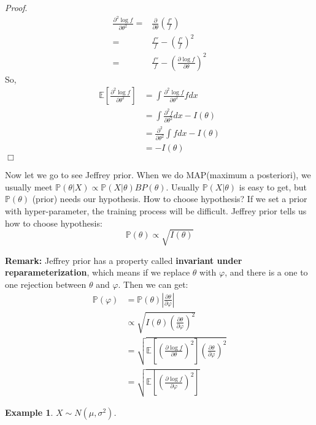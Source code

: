 \documentclass[11pt]{article}
\def\BP{{\bf P}}
\def\BP{{\mathbb P}}
\def\BE{{\mathbb E}}
\newtheorem{example}{Example}[section]
\begin{document}
\textit{Proof}.
  \begin{equation*}
    \begin{split}
      \frac{\partial^2 \log f}{\partial \theta^2} = & \frac{\partial}{\partial \theta} \left( \frac{f'}{f}\right) \\
       = & \frac{f''}{f} - \left(\frac{f'}{f}\right)^2 \\
       = & \frac{f''}{f} - \left(\frac{\partial \log f}{\partial \theta}\right)^2 
    \end{split}
  \end{equation*}
  So, \[\begin{split}
  \BE[\frac{\partial^2 \log f}{\partial \theta^2}] & = \int \frac{\partial^2 \log f}{\partial \theta^2} f dx \\
  & = \int \frac{\partial^2 f}{\partial \theta^2} dx - I(\theta) \\
  & = \frac{\partial^2}{\partial \theta^2} \int f dx - I(\theta)  \\
  & = - I(\theta)
  \end{split}\]
\hfill$\Box$
  
Now let we go to see Jeffrey prior. When we do MAP(maximum a posteriori), we usually meet $\BP(\theta | X) \propto \BP(X | \theta) BP(\theta)$. 
Usually $\BP(X | \theta)$ is easy to get, but $\BP(\theta)$ (prior) needs our hypothesis. How to choose hypothesis? If we set a prior with hyper-parameter, the training process will be difficult. Jeffrey prior tells us how to choose hypothesis:
\[ \BP(\theta) \propto \sqrt{I(\theta)}\]

\textbf{Remark:} Jeffrey prior has a property called \textbf{ invariant under reparameterization}, which means if we replace $\theta$ with $\varphi$, and there is a one to one rejection between $\theta$ and $\varphi$. Then we can get:
\[\begin{split} \BP(\varphi) & = \BP(\theta) \left| \frac{\partial \theta}{\partial \varphi} \right| \\
& \propto \sqrt{ I (\theta) \left(\frac{\partial \theta}{\partial \varphi}\right)^2} \\
& = \sqrt{\BE\left[ \left(\frac{\partial \log f}{\partial \theta}\right)^2\right]\left(\frac{\partial \theta}{\partial \varphi}\right)^2} \\
& = \sqrt{\BE\left[ \left( \frac{\partial \log f}{\partial \varphi} \right)^2 \right]}
\end{split}\]

\begin{example}
$X \sim N(\mu, \sigma^2)$.
\end{example}
\end{document}
